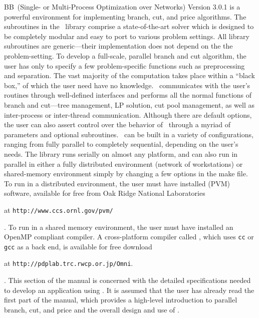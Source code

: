BB\ (Single- or Multi-Process Optimization over Networks) Version 3.0.1
is a powerful environment for implementing branch, cut, and price
algorithms. The subroutines in the \BB\ library comprise a
state-of-the-art solver which is designed to be completely modular and
easy to port to various problem settings. All library subroutines are
generic---their implementation does not depend on the the
problem-setting. To develop a full-scale, parallel branch and cut
algorithm, the user has only to specify a few problem-specific
functions such as preprocessing and separation. The vast majority of
the computation takes place within a ``black box,'' of which the user
need have no knowledge. \BB\ communicates with the user's routines
through well-defined interfaces and performs all the normal functions
of branch and cut---tree management, LP solution, cut pool management,
as well as inter-process or inter-thread communication. Although there
are default options, the user can also assert control over the
behavior of \BB\ through a myriad of parameters and optional
subroutines. \BB\ can be built in a variety of configurations, ranging
from fully parallel to completely sequential, depending on the user's
needs. The library runs serially on almost any platform, and can also
run in parallel in either a fully distributed environment (network of
workstations) or shared-memory environment simply by changing a few
options in the make file. To run in a distributed environment, the
user must have installed {\em {}} (PVM) software, available for
free from Oak Ridge National Laboratories
\begin{latexonly}
at {\tt http://www.ccs.ornl.gov/pvm/} 
\end{latexonly}. 
To run in a shared memory environment, the user must have installed an
OpenMP compliant compiler. A cross-platform compiler called {\em
{}}, which uses 
{\tt cc} or {\tt gcc} as a back end, is available for free download
\begin{latexonly}
at {\tt http://pdplab.trc.rwcp.or.jp/Omni}.
\end{latexonly}.
This section of the manual is concerned with the detailed
specifications needed to develop an application using \BB. It is
assumed that the user has already read the first part of the manual, which
provides a high-level introduction to parallel branch, cut, and price
and the overall design and use of \BB. 

